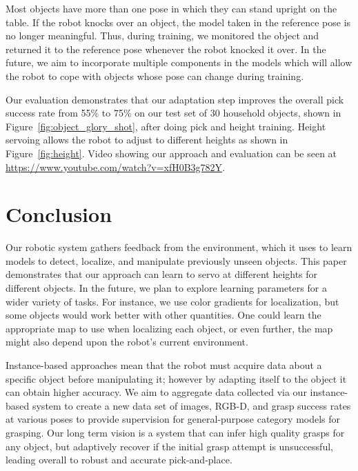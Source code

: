 \documentclass[conference,onecolumn]{IEEEtran}
\begin{document}
Most objects have more than one pose in which they can stand upright
on the table. If the robot knocks over an object, the model taken in
the reference pose is no longer meaningful. Thus, during training, we
monitored the object and returned it to the reference pose whenever
the robot knocked it over. In the future, we aim to incorporate
multiple components in the models which will allow the robot to cope
with objects whose pose can change during training.

Our evaluation demonstrates that our adaptation step improves the
overall pick success rate from 55\% to 75\% on our test set of 30
household objects, shown in Figure~\ref{fig:object_glory_shot}, after
doing pick and height training.  Height servoing allows the robot to
adjust to different heights as shown in Figure~\ref{fig:height}.
Video showing our approach and evaluation can be seen at
\url{https://www.youtube.com/watch?v=xfH0B3g782Y}.

\section*{Conclusion}

Our robotic system gathers feedback from the environment, which it
uses to learn models to detect, localize, and manipulate previously
unseen objects.  This paper demonstrates that our approach can learn
to servo at different heights for different objects.  In the future,
we plan to explore learning parameters for a wider variety of tasks.
For instance, we use color gradients for localization,
but some objects would work better with other quantities. One could
learn the appropriate map to use when localizing each object, or even
further, the map might also depend upon the robot's current
environment.

Instance-based approaches mean that the robot must acquire data about
a specific object before manipulating it; however by adapting itself
to the object it can obtain higher accuracy.  We aim to aggregate data
collected via our instance-based system to create a new data set of
images, RGB-D, and grasp success rates at various poses to provide
supervision for general-purpose category models for grasping.  Our
long term vision is a system that can infer high quality grasps for
any object, but adaptively recover if the initial grasp attempt is
unsuccessful, leading overall to robust and accurate pick-and-place.



\end{document}
